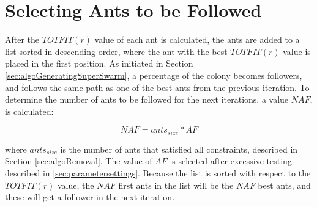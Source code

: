 \section{Selecting Ants to be Followed}
\label{sec:selctingAntsToBeFollowed}

After the $TOTFIT(r)$ value of each ant is calculated, the ants are added to a list sorted in descending order, where the ant with the best $TOTFIT(r)$ value is placed in the first position. As initiated in Section \vref{sec:algoGeneratingSuperSwarm}, a percentage of the colony becomes followers, and follows the same path as one of the best ants from the previous iteration. To determine the number of ants to be followed for the next iterations, a value $NAF$, is calculated:

$$NAF = ants_{size} * AF$$
 
where $ants_{size}$ is the number of ants that satisfied all constraints, described in Section \vref{sec:algoRemoval}. The value of $AF$ is selected after excessive testing described in \vref{sec:parametersettings}. Because the list is sorted with respect to the $TOTFIT(r)$ value, the $NAF$ first ants in the list will be the $NAF$ best ants, and these will get a follower in the next iteration.  


 
